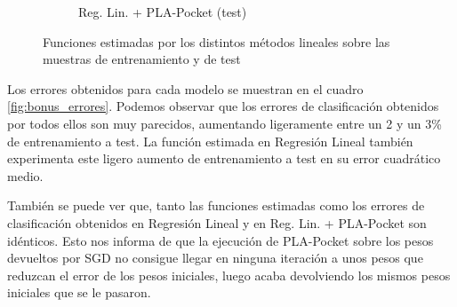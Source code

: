 \documentclass[10pt,a4paper]{article}
\begin{document}
\begin{figure}
\begin{subfigure}{0.5\textwidth}
		\caption{Reg. Lin. + PLA-Pocket (test)}
	\end{subfigure}
	\caption{Funciones estimadas por los distintos métodos lineales sobre las muestras de entrenamiento y de test}
	\label{fig:bonus_funciones_estimadas}
\end{figure}

Los errores obtenidos para cada modelo se muestran en el cuadro \ref{fig:bonus_errores}. Podemos observar que los errores de clasificación obtenidos por todos ellos son muy parecidos, aumentando ligeramente entre un 2 y un 3\% de entrenamiento a test. La función estimada en Regresión Lineal también experimenta este ligero aumento de entrenamiento a test en su error cuadrático medio.

También se puede ver que, tanto las funciones estimadas como los errores de clasificación obtenidos en Regresión Lineal y en Reg. Lin. + PLA-Pocket son idénticos. Esto nos informa de que la ejecución de PLA-Pocket sobre los pesos devueltos por SGD no consigue llegar en ninguna iteración a unos pesos que reduzcan el error de los pesos iniciales, luego acaba devolviendo los mismos pesos iniciales que se le pasaron.
\end{document}
